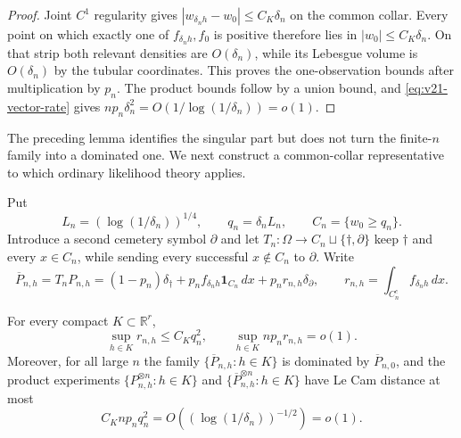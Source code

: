 \begin{proof}
Joint $C^1$ regularity gives
$|w_{\delta_nh}-w_0|\le C_K\delta_n$ on the common collar.  Every point on
which exactly one of $f_{\delta_nh},f_0$ is positive therefore lies in
$|w_0|\le C_K\delta_n$.  On that strip both relevant densities are
$O(\delta_n)$, while its Lebesgue volume is $O(\delta_n)$ by the tubular
coordinates.  This proves the one-observation bounds after multiplication by
$p_n$.  The product bounds follow by a union bound, and
\eqref{eq:v21-vector-rate} gives
$np_n\delta_n^2=O(1/\log(1/\delta_n))=o(1)$.
\end{proof}

The preceding lemma identifies the singular part but does not turn the
finite-$n$ family into a dominated one.  We next construct a common-collar
representative to which ordinary likelihood theory applies.

Put
\begin{equation}\label{eq:v21-truncation-scale}
 L_n=(\log(1/\delta_n))^{1/4},\qquad
 q_n=\delta_nL_n,\qquad C_n=\{w_0\ge q_n\}.
\end{equation}
Introduce a second cemetery symbol $\partial$ and let
$T_n:\Omega\to C_n\sqcup\{\dagger,\partial\}$ keep $\dagger$ and every
$x\in C_n$, while sending every successful $x\notin C_n$ to $\partial$.
Write
\begin{equation}\label{eq:v21-censored-law}
 \overline P_{n,h}=T_nP_{n,h}
 =(1-p_n)\delta_\dagger
 +p_nf_{\delta_nh}\mathbf1_{C_n}\,dx
 +p_nr_{n,h}\delta_\partial,
 \qquad
 r_{n,h}=\int_{C_n^c}f_{\delta_nh}\,dx.
\end{equation}

\begin{lemma}
\label{lem:v21-common-collar-equivalence}
For every compact $K\subset\mathbb R^r$,
\begin{equation}\label{eq:v21-collar-mass}
 \sup_{h\in K}r_{n,h}\le C_Kq_n^2,
 \qquad
 \sup_{h\in K}np_nr_{n,h}=o(1).
\end{equation}
Moreover, for all large $n$ the family
$\{\overline P_{n,h}:h\in K\}$ is dominated by
$\overline P_{n,0}$, and the product experiments
$\{P_{n,h}^{\otimes n}:h\in K\}$ and
$\{\overline P_{n,h}^{\otimes n}:h\in K\}$ have Le Cam distance at most
\begin{equation}\label{eq:v21-lecam-censoring}
 C_Knp_nq_n^2
 =O((\log(1/\delta_n))^{-1/2})=o(1).
\end{equation}
\end{lemma}

